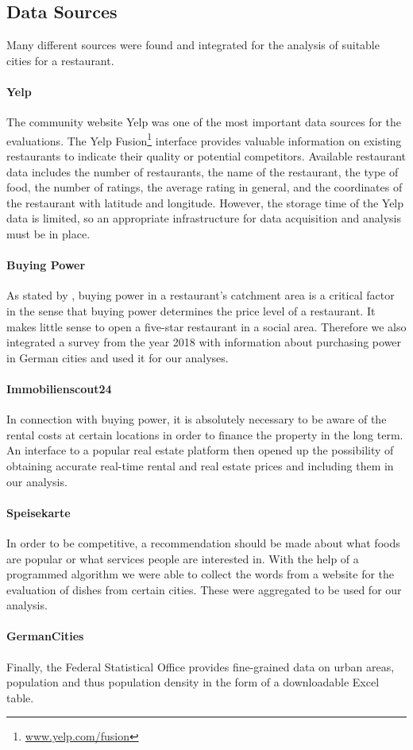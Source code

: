 \subsection{Data Sources}
\label{subsec:sources}
Many different sources were found and integrated for the analysis of suitable cities for a restaurant. 
\newline
\paragraph{Yelp}
The community website Yelp was one of the most important data sources for the evaluations. The Yelp Fusion\footnote{\href{https://www.yelp.com/fusion}{www.yelp.com/fusion}} interface provides valuable information on existing restaurants to indicate their quality or potential competitors. Available restaurant data includes the number of restaurants, the name of the restaurant, the type of food, the number of ratings, the average rating in general, and the coordinates of the restaurant with latitude and longitude. However, the storage time of the Yelp data is limited, so an appropriate infrastructure for data acquisition and analysis must be in place.
\newline
\paragraph {Buying Power}
As stated by \cite{locana}, buying power in a restaurant's catchment area is a critical factor in the sense that buying power determines the price level of a restaurant. It makes little sense to open a five-star restaurant in a social area. Therefore we also integrated a survey \cite{buyingpower} from the year 2018 with information about purchasing power in German cities and used it for our analyses.
\newline
\paragraph{Immobilienscout24}
In connection with buying power, it is absolutely necessary to be aware of the rental costs at certain locations in order to finance the property in the long term\cite{locana}. An interface to a popular real estate platform \cite{ImmoScout} then opened up the possibility of obtaining accurate real-time rental and real estate prices and including them in our analysis.
\newline
\paragraph{Speisekarte}
In order to be competitive, a recommendation should be made about what foods are popular or what services people are interested in. With the help of a programmed algorithm we were able to collect the words from a website \cite{speisekarte} for the evaluation of dishes from certain cities. These were aggregated to be used for our analysis.
\newline
\paragraph{GermanCities}
Finally, the Federal Statistical Office provides fine-grained data on urban areas, population and thus population density in the form of a downloadable Excel table.\cite{destatis}
